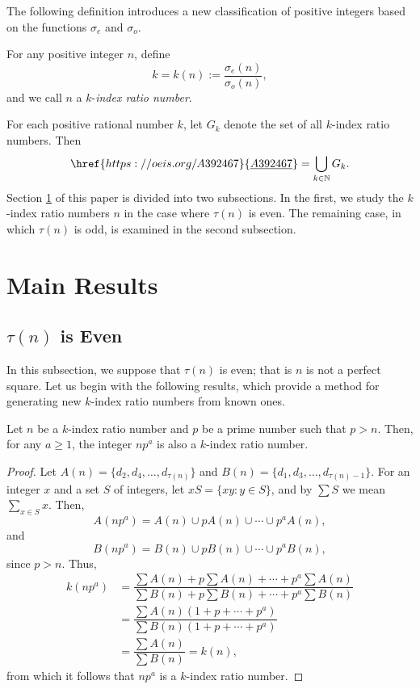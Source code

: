 \documentclass[12pt,reqno]{article}
\newcommand{\seqnum}[1]{\href{https://oeis.org/#1}{\underline{#1}}}
\begin{document}
The following definition introduces a new classification of positive integers based on the functions $\sigma_{e}$ and $\sigma_{o}$.

\begin{definition}
For any positive integer $n$, define
$$
k=k(n):=\dfrac{\sigma_{e}(n)}{\sigma_{o}(n)},
$$
and we call $n$ a $k$-\emph{index ratio number}. 
\end{definition}

For each positive rational number $k$, let $G_k$ denote the set of all $k$-index ratio numbers. Then
$$
\seqnum{A392467}=\bigcup_{k\in\mathbb{N}}G_k.
$$
Section \ref{S2} of this paper is divided into two subsections. In the first, we study the $k$-index ratio numbers $n$ in the case where $\tau(n)$ is even. The remaining case, in which $\tau(n)$ is odd, is examined in the second subsection.

\section{Main Results}\label{S2}

\subsection{\texorpdfstring{$\tau(n)$ is Even}{}}
In this subsection, we suppose that \(\tau(n)\) is even; that is \(n\) is not a perfect square. Let us begin with the following results, which provide a method for generating new \(k\)-index ratio numbers from known ones.

\begin{theorem}\label{th6}
Let $n$ be a $k$-index ratio number and $p$ be a prime number such that $p > n$. Then, for any $a \geq 1$, the integer $np^a$ is also a $k$-index ratio number.
\end{theorem}

\begin{proof}
Let $A(n) = \{d_2, d_4, \ldots, d_{\tau(n)}\}$ and $B(n) = \{d_1, d_3, \ldots, d_{\tau(n)-1}\}$. For an integer $x$ and a set $S$ of integers, let $xS = \{xy : y \in S\}$, and by $\sum S$ we mean $\sum_{x \in S} x$. Then,
$$
A(np^a) = A(n) \cup p A(n) \cup \cdots \cup p^a A(n),
$$
and 
$$
B(np^a) = B(n) \cup p B(n) \cup \cdots \cup p^a B(n),
$$
since $p > n$. Thus,
\begin{align*}
k(np^a) &= \dfrac{\sum A(n) + p \sum A(n) + \cdots + p^a \sum A(n)}{\sum B(n) + p \sum B(n) + \cdots + p^a \sum B(n)} \\
&= \dfrac{\sum A(n) (1 + p + \cdots + p^a)}{\sum B(n) (1 + p + \cdots + p^a)} \\
&= \dfrac{\sum A(n)}{\sum B(n)} = k(n),
\end{align*}
from which it follows that $np^a$ is a $k$-index ratio number.
\end{proof}
\end{document}
